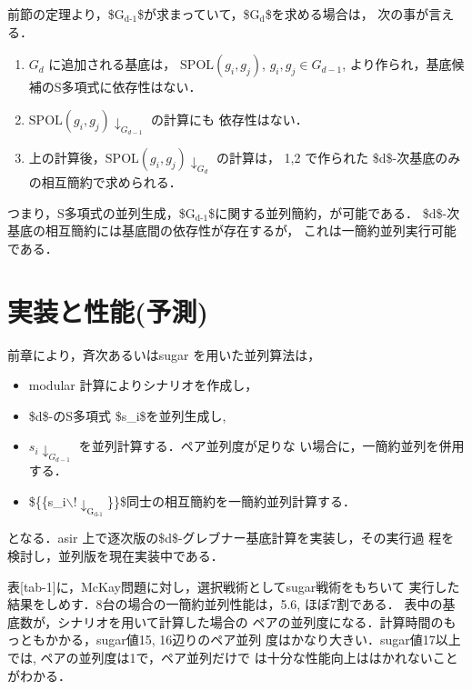 \documentclass[a4j]{jarticle}
\begin{document}
{前節の定理より，\$G\(_{\text{d-1}}\)\$が求まっていて，\$G\(_{\text{d}}\)\$を求める場合は，
次の事が言える．

\begin{enumerate}
\item \(G_d\) に追加される基底は， \({\mathrm{SPOL}}(g_i, g_j)\),
\(g_i, g_j \in G_{d-1}\), より作られ，基底候補のS多項式に依存性はない．

\item \({{{\mathrm{SPOL}}(g_i, g_j)\!\downarrow_{G_{d-1}}}}\) の計算にも
依存性はない．

\item 上の計算後，\({{{\mathrm{SPOL}}(g_i, g_j)\!\downarrow_{G_{d}}}}\)
の計算は， 1,2 で作られた \$d\$-次基底のみの相互簡約で求められる．
\end{enumerate}

つまり，S多項式の並列生成，\$G\(_{\text{d-1}}\)\$に関する並列簡約，が可能である．
\$d\$-次基底の相互簡約には基底間の依存性が存在するが，
これは一簡約並列実行可能である．

\section{実装と性能(予測)}
\label{sec:orgebe8bf8}

前章により，斉次あるいはsugar を用いた並列算法は，

\begin{itemize}
\item modular 計算によりシナリオを作成し，

\item \$d\$-のS多項式 \$s\_i\$を並列生成し,

\item \({{s_i\!\downarrow_{G_{d-1}}}}\) を並列計算する．ペア並列度が足りな
い場合に，一簡約並列を併用する．

\item \$\{\{s\_i$\backslash$!\(\downarrow_{\text{G}_{\text{d-1}}}\)\}\}\$同士の相互簡約を一簡約並列計算する．
\end{itemize}

となる．asir 上で逐次版の\$d\$-グレブナー基底計算を実装し，その実行過
程を検討し，並列版を現在実装中である．

表[tab-1]に，McKay\cite{noro97-mckay}問題に対し，選択戦術としてsugar戦術をもちいて
実行した結果をしめす．8台の場合の一簡約並列性能は，5.6, ほぼ7割である．
表中の基底数が，シナリオを用いて計算した場合の
ペアの並列度になる．計算時間のもっともかかる，sugar値15,
16辺りのペア並列 度はかなり大きい．sugar値17以上では,
ペアの並列度は1で，ペア並列だけで
は十分な性能向上ははかれないことがわかる．

}
\end{document}
